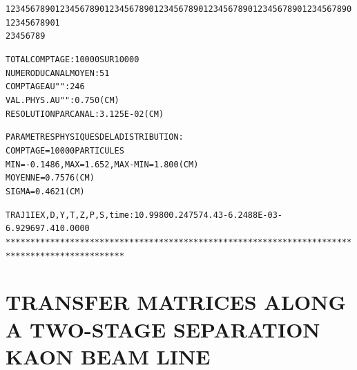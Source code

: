 \begin{tiny}
\begin{center}
\begin{alltt}
            123456789012345678901234567890123456789012345678901234567890123456789012345678901
                     2         3         4         5         6         7         8         9

                  
        TOTAL  COMPTAGE                 :   10000  SUR  10000
        NUMERO   DU  CANAL  MOYEN       :      51
        COMPTAGE  AU   "      "         :     246
        VAL. PHYS. AU  "      "         :  0.750     (CM) 
        RESOLUTION  PAR  CANAL          :  3.125E-02 (CM) 
             
        PARAMETRES  PHYSIQUES  DE  LA  DISTRIBUTION :
                      COMPTAGE =  10000  PARTICULES
                      MIN = -0.1486    , MAX =   1.652    , MAX-MIN =   1.800     (CM) 
                      MOYENNE =  0.7576     (CM) 
                      SIGMA =  0.4621     (CM) 

 TRAJ 1 IEX,D,Y,T,Z,P,S,time :  1  0.9980 0.2475 74.43 -6.2488E-03 -6.929   697.41 0.0000    
**********************************************************************************************
\end{alltt}

\onecolumn
\end{center}
\end{tiny}

\clearpage



\section{TRANSFER MATRICES ALONG A TWO-STAGE SEPARATION KAON BEAM LINE}

\vfill

